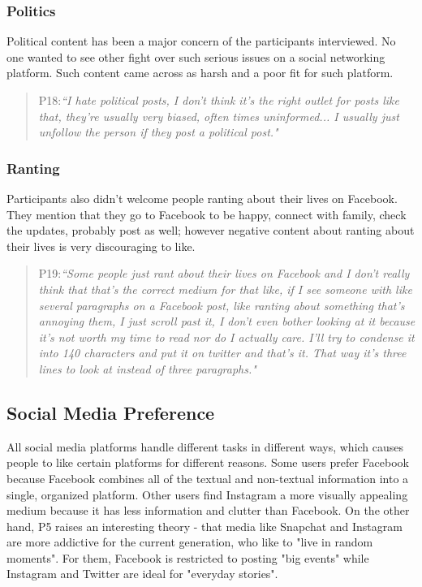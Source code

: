 \subsubsection{Politics}
Political content has been a major concern of the participants interviewed. No one wanted to see other fight over such serious issues on a social networking platform. Such content came across as harsh and a poor fit for such platform.
\begin{quote}
P18:\textit{``I hate political posts, I don't think it's the right outlet for posts like that, they're usually very biased, often times uninformed... I usually just unfollow the person if they post a political post."}
\end{quote}
\subsubsection{Ranting}
Participants also didn't welcome people ranting about their lives on Facebook. They mention that they go to Facebook to be happy, connect with family, check the updates, probably post as well; however negative content about ranting about their lives is very discouraging to like.
\begin{quote}
P19:\textit{``Some people just rant about their lives on Facebook and I don't really think that that's the correct medium for that like, if I see someone with like several paragraphs on a Facebook post, like ranting about something that's annoying them, I just scroll past it, I don't even bother looking at it because it's not worth my time to read nor do I actually care. I'll try to condense it into 140 characters and put it on twitter and that's it. That way it's three lines to look at instead of three paragraphs."}
\end{quote}

\subsection{Social Media Preference}
All social media platforms handle different tasks in different ways, which causes people to like certain platforms for different reasons. Some users prefer Facebook because Facebook combines all of the textual and non-textual information into a single, organized platform. Other users find Instagram a more visually appealing medium because it has less information and clutter than Facebook. On the other hand, P5 raises an interesting theory - that media like Snapchat and Instagram are more addictive for the current generation, who like to "live in random moments". For them, Facebook is restricted to posting "big events" while Instagram and Twitter are ideal for "everyday stories".

